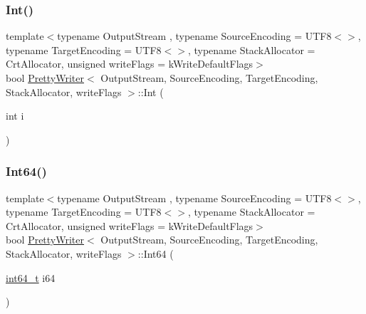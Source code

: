 \subsubsection{\texorpdfstring{Int()}{Int()}}
{\footnotesize\ttfamily template$<$typename Output\+Stream , typename Source\+Encoding  = U\+T\+F8$<$$>$, typename Target\+Encoding  = U\+T\+F8$<$$>$, typename Stack\+Allocator  = Crt\+Allocator, unsigned write\+Flags = k\+Write\+Default\+Flags$>$ \\
bool \hyperlink{classPrettyWriter}{Pretty\+Writer}$<$ Output\+Stream, Source\+Encoding, Target\+Encoding, Stack\+Allocator, write\+Flags $>$\+::Int (\begin{DoxyParamCaption}\item[{int}]{i }\end{DoxyParamCaption})\hspace{0.3cm}{\ttfamily [inline]}}

\mbox{\label{classPrettyWriter_ad42b797429f4ee19efdce610f5aff976}} 
\subsubsection{\texorpdfstring{Int64()}{Int64()}}
{\footnotesize\ttfamily template$<$typename Output\+Stream , typename Source\+Encoding  = U\+T\+F8$<$$>$, typename Target\+Encoding  = U\+T\+F8$<$$>$, typename Stack\+Allocator  = Crt\+Allocator, unsigned write\+Flags = k\+Write\+Default\+Flags$>$ \\
bool \hyperlink{classPrettyWriter}{Pretty\+Writer}$<$ Output\+Stream, Source\+Encoding, Target\+Encoding, Stack\+Allocator, write\+Flags $>$\+::Int64 (\begin{DoxyParamCaption}\item[{\hyperlink{stdint_8h_a414156feea104f8f75b4ed9e3121b2f6}{int64\+\_\+t}}]{i64 }\end{DoxyParamCaption})\hspace{0.3cm}{\ttfamily [inline]}}

\mbox{\label{classPrettyWriter_a20ecbe1d31a871e4da4a3899b40ad3cd}} 
